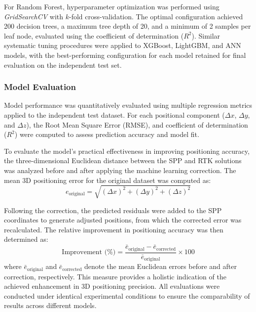 \documentclass{isprs} %
\begin{document}
For Random Forest, hyperparameter optimization was performed using \textit{GridSearchCV} with $k$-fold cross-validation. The optimal configuration achieved 200 decision trees, a maximum tree depth of 20, and a minimum of 2 samples per leaf node, evaluated using the coefficient of determination (\(R^2\)). Similar systematic tuning procedures were applied to XGBoost, LightGBM, and ANN models, with the best-performing configuration for each model retained for final evaluation on the independent test set.





\subsubsection{Model Evaluation}
Model performance was quantitatively evaluated using multiple regression metrics applied to the independent test dataset. For each positional component (\(\Delta x\), \(\Delta y\), and \(\Delta z\)), the Root Mean Square Error (RMSE), and coefficient of determination (\(R^2\)) were computed to assess prediction accuracy and model fit. 

To evaluate the model's practical effectiveness in improving positioning accuracy, the three-dimensional Euclidean distance between the SPP and RTK solutions was analyzed before and after applying the machine learning correction. The mean 3D positioning error for the original dataset was computed as:
\begin{equation}
e_{\text{original}} = \sqrt{(\Delta x)^2 + (\Delta y)^2 + (\Delta z)^2}
\end{equation}

Following the correction, the predicted residuals were added to the SPP coordinates to generate adjusted positions, from which the corrected error was recalculated. The relative improvement in positioning accuracy was then determined as:
\begin{equation}
\text{Improvement (\%)} = \frac{\bar{e}_{\text{original}} - \bar{e}_{\text{corrected}}}{\bar{e}_{\text{original}}} \times 100
\end{equation}
where \(\bar{e}_{\text{original}}\) and \(\bar{e}_{\text{corrected}}\) denote the mean Euclidean errors before and after correction, respectively. This measure provides a holistic indication of the achieved enhancement in 3D positioning precision. All evaluations were conducted under identical experimental conditions to ensure the comparability of results across different models.
\end{document}
